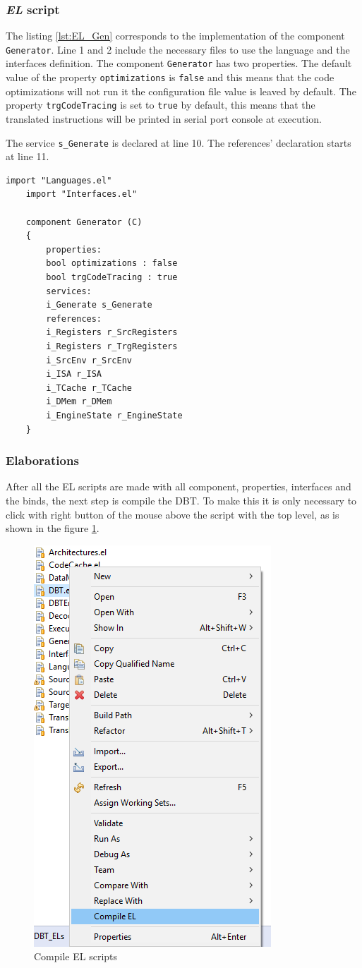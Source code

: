 \subsubsection{\textit{EL} script}

\par The listing \ref{lst:EL_Gen} corresponds to the implementation of the component \texttt{Generator}. Line 1 and 2 include the necessary files to use the language and the interfaces definition. The component \texttt{Generator} has two properties. The default value of the property \texttt{optimizations} is \texttt{false} and this means that the code optimizations will not run it the configuration file value is leaved by default. The property \texttt{trgCodeTracing} is set to \texttt{true} by default, this means that the translated instructions will be printed in serial port console at execution.
\par The service \texttt{s\_Generate} is declared at line 10. The references' declaration starts at line 11.

\begin{lstlisting}[language=EL, caption=Generator (EL representation)., label=lst:EL_Gen]
	import "Languages.el"
	import "Interfaces.el"
	
	component Generator (C)
	{
		properties:
		bool optimizations : false
		bool trgCodeTracing : true
		services:
		i_Generate s_Generate	
		references:
		i_Registers r_SrcRegisters
		i_Registers r_TrgRegisters
		i_SrcEnv r_SrcEnv
		i_ISA r_ISA
		i_TCache r_TCache
		i_DMem r_DMem				
		i_EngineState r_EngineState
	}
\end{lstlisting}

\subsubsection{Elaborations}

After all the EL scripts are made with all component, properties, interfaces and the binds, the next step is compile the DBT. To make this it is only necessary to click with right button of the mouse above the script with the top level, as is shown in the figure \ref{fig:compileel}.

\begin{figure} [H]
	\centering
	\includegraphics[width=0.4\linewidth]{images/compileEL}
	\caption{Compile EL scripts}
	\label{fig:compileel}
\end{figure}

